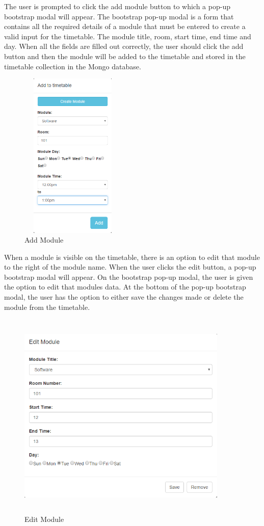 The user is prompted to click the add module button to which a pop-up bootstrap modal will appear. The bootstrap pop-up modal is a form that contains all the required details of a module that must be entered to create a valid input for the timetable. The module title, room, start time, end time and day. When all the fields are filled out correctly, the user should click the add button and then the module will be added to the timetable and stored in the timetable collection in the Mongo database.

\begin{figure}[h]
\centering
\includegraphics[width=5cm, height=8cm]{img/AddModule}
\caption{Add Module}
\label{fig:AddModule}
\end{figure}

When a module is visible on the timetable, there is an option to edit that module to the right of the module name. When the user clicks the edit button, a pop-up bootstrap modal will appear. On the bootstrap pop-up modal, the user is given the option to edit that modules data. At the bottom of the pop-up bootstrap modal, the user has the option to either save the changes made or delete the module from the timetable.

\begin{figure}[h]
\centering
\includegraphics[width=10cm, height=10cm]{img/editModule}
\caption{Edit Module}
\label{fig:AddModule}
\end{figure}
\newpage

